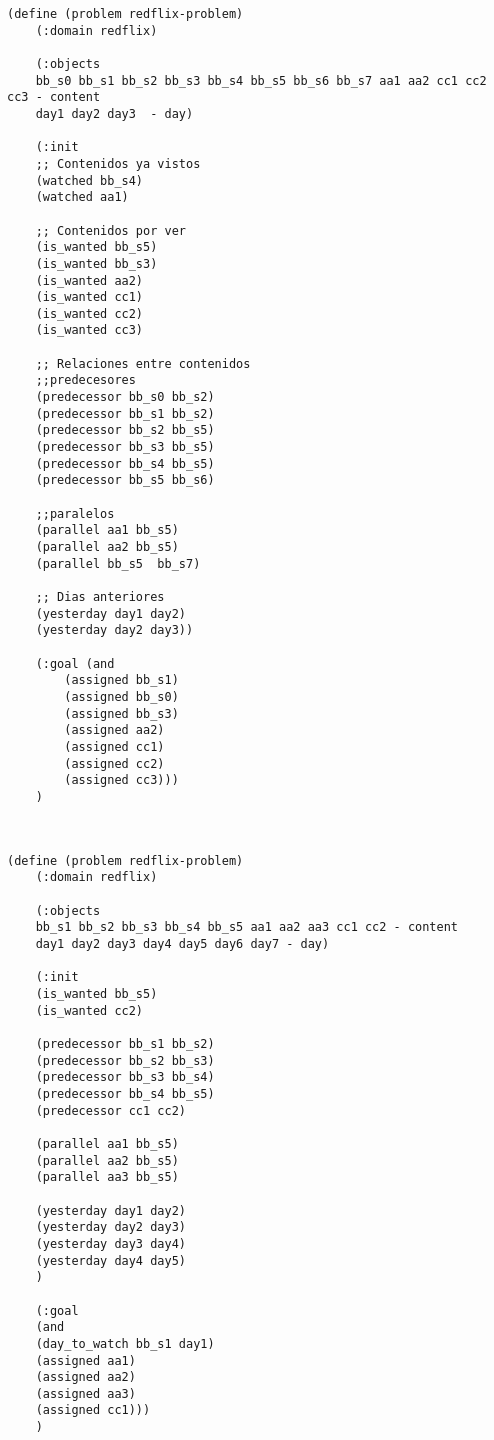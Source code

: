 \documentclass[a4paper]{article}
\begin{document}
	
	\noindent
	\begin{minipage}[t]{0.45\textwidth}
	\begin{lstlisting}[language=PDDL, caption={Joc de Prova 1 - Extensió 3}, label={lst:JP13}]                     
	(define (problem redflix-problem)
	(:domain redflix)
	
	(:objects
	bb_s0 bb_s1 bb_s2 bb_s3 bb_s4 bb_s5 bb_s6 bb_s7 aa1 aa2 cc1 cc2 cc3 - content
	day1 day2 day3  - day)
	
	(:init
	;; Contenidos ya vistos
	(watched bb_s4)
	(watched aa1)
	
	;; Contenidos por ver
	(is_wanted bb_s5)
	(is_wanted bb_s3)
	(is_wanted aa2)
	(is_wanted cc1)
	(is_wanted cc2)
	(is_wanted cc3)
	
	;; Relaciones entre contenidos
	;;predecesores
	(predecessor bb_s0 bb_s2)
	(predecessor bb_s1 bb_s2)
	(predecessor bb_s2 bb_s5)
	(predecessor bb_s3 bb_s5)
	(predecessor bb_s4 bb_s5)
	(predecessor bb_s5 bb_s6)
	
	;;paralelos
	(parallel aa1 bb_s5)
	(parallel aa2 bb_s5)
	(parallel bb_s5  bb_s7)
	
	;; Dias anteriores
	(yesterday day1 day2)
	(yesterday day2 day3))
	
	(:goal (and
		(assigned bb_s1)
		(assigned bb_s0)
		(assigned bb_s3)
		(assigned aa2)
		(assigned cc1)
		(assigned cc2)
		(assigned cc3)))
	)
	
	
\end{lstlisting}
	
	\end{minipage}
	\hfill
	\begin{minipage}[t]{0.45\textwidth}
	\begin{lstlisting}[language=PDDL, caption={Joc de Prova 2 - Extensió 3}, label={lst:JP23}]                    (define (problem redflix-problem)
	(:domain redflix)
	
	(:objects
	bb_s1 bb_s2 bb_s3 bb_s4 bb_s5 aa1 aa2 aa3 cc1 cc2 - content
	day1 day2 day3 day4 day5 day6 day7 - day)
	
	(:init
	(is_wanted bb_s5)
	(is_wanted cc2)
	
	(predecessor bb_s1 bb_s2)
	(predecessor bb_s2 bb_s3)
	(predecessor bb_s3 bb_s4)
	(predecessor bb_s4 bb_s5)
	(predecessor cc1 cc2)
	
	(parallel aa1 bb_s5)
	(parallel aa2 bb_s5)
	(parallel aa3 bb_s5)
	
	(yesterday day1 day2)
	(yesterday day2 day3)
	(yesterday day3 day4)
	(yesterday day4 day5)
	)
	
	(:goal
	(and
	(day_to_watch bb_s1 day1)
	(assigned aa1)
	(assigned aa2)
	(assigned aa3)
	(assigned cc1)))
	)

		
	\end{lstlisting}
	\end{minipage}
	
\end{document}
